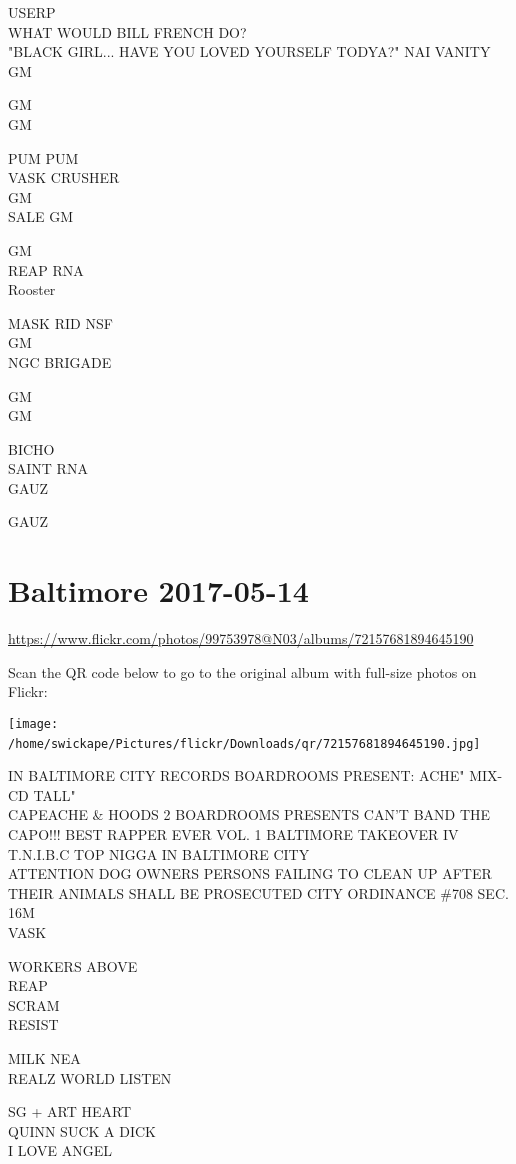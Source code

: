 \documentclass[10pt,letterpaper]{article}
\begin{document}
USERP\\
WHAT WOULD BILL FRENCH DO?\\
"BLACK GIRL... HAVE YOU LOVED YOURSELF TODYA?"  NAI VANITY\\
GM

GM\\
GM

PUM PUM\\
VASK CRUSHER\\
GM\\
SALE GM

GM\\
REAP RNA\\
Rooster

MASK RID NSF\\
GM\\
NGC BRIGADE

GM\\
GM

BICHO\\
SAINT RNA\\
GAUZ

GAUZ
\

\section*{Baltimore 2017-05-14}

\url{https://www.flickr.com/photos/99753978@N03/albums/72157681894645190}

Scan the QR code below to go to the original album with full-size photos on Flickr:

\texttt{[image: /home/swickape/Pictures/flickr/Downloads/qr/72157681894645190.jpg]}
\

IN BALTIMORE CITY RECORDS BOARDROOMS PRESENT: ACHE" MIX{-}CD TALL"\\
CAPEACHE \& HOODS 2 BOARDROOMS PRESENTS CAN'T BAND THE CAPO!!! BEST RAPPER EVER VOL. 1 BALTIMORE TAKEOVER IV T.N.I.B.C TOP NIGGA IN BALTIMORE CITY\\
ATTENTION DOG OWNERS PERSONS FAILING TO CLEAN UP AFTER THEIR ANIMALS SHALL BE PROSECUTED CITY ORDINANCE \#708 SEC. 16M\\
VASK

WORKERS ABOVE\\
REAP\\
SCRAM\\
RESIST

MILK NEA\\
REALZ WORLD LISTEN

SG + ART HEART\\
QUINN SUCK A DICK\\
I LOVE ANGEL
\end{document}
